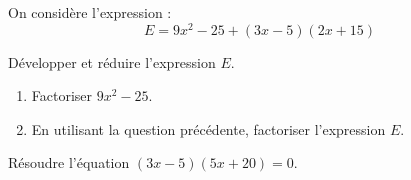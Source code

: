 On considère l'expression :
\[E= 9x^2 - 25 + (3x - 5)(2x + 15) \]
\begin{myenumerate}
\item Développer et réduire l'expression $E$.
\item \begin{enumerate}
\item Factoriser $9x^2 - 25$.
\item En utilisant la question précédente, factoriser l'expression $E$.
\end{enumerate}
\item Résoudre l'équation $(3x-5)(5x+20)= 0$.
\end{myenumerate}